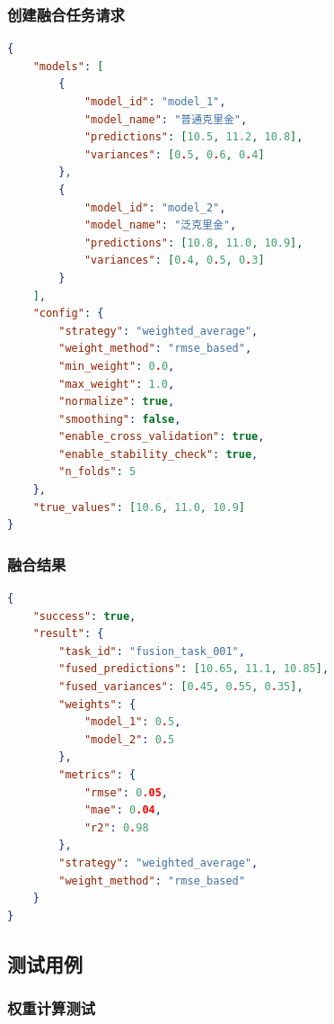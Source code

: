 \documentclass[12pt,a4paper,openany]{report}
\begin{document}
\subsubsection{创建融合任务请求}

\begin{lstlisting}[language=JSON, caption=创建融合任务请求]
{
    "models": [
        {
            "model_id": "model_1",
            "model_name": "普通克里金",
            "predictions": [10.5, 11.2, 10.8],
            "variances": [0.5, 0.6, 0.4]
        },
        {
            "model_id": "model_2",
            "model_name": "泛克里金",
            "predictions": [10.8, 11.0, 10.9],
            "variances": [0.4, 0.5, 0.3]
        }
    ],
    "config": {
        "strategy": "weighted_average",
        "weight_method": "rmse_based",
        "min_weight": 0.0,
        "max_weight": 1.0,
        "normalize": true,
        "smoothing": false,
        "enable_cross_validation": true,
        "enable_stability_check": true,
        "n_folds": 5
    },
    "true_values": [10.6, 11.0, 10.9]
}
\end{lstlisting}

\subsubsection{融合结果}

\begin{lstlisting}[language=JSON, caption=融合结果]
{
    "success": true,
    "result": {
        "task_id": "fusion_task_001",
        "fused_predictions": [10.65, 11.1, 10.85],
        "fused_variances": [0.45, 0.55, 0.35],
        "weights": {
            "model_1": 0.5,
            "model_2": 0.5
        },
        "metrics": {
            "rmse": 0.05,
            "mae": 0.04,
            "r2": 0.98
        },
        "strategy": "weighted_average",
        "weight_method": "rmse_based"
    }
}
\end{lstlisting}

\subsection{测试用例}

\subsubsection{权重计算测试}
\end{document}
